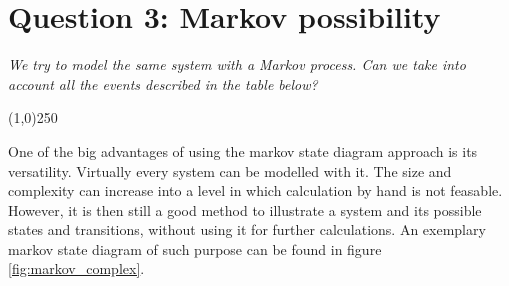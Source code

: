 \section{Question 3: Markov possibility}
\textit{We try to model the	same system with a Markov process. Can we take into account all the events described in the table below?}	
 \begin{center}
\line(1,0){250}
\end{center}
One of the big advantages of using the markov state diagram approach is its versatility. Virtually every system can be modelled with it. The size and complexity can increase into a level in which calculation by hand is not feasable. However, it is then still a good method to illustrate a system and its possible states and transitions, without using it for further calculations. An exemplary markov state diagram of such purpose can be found in figure \ref{fig:markov_complex}.

